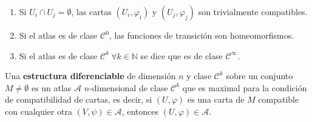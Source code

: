 \begin{obs} \:
\begin{enumerate}
    \item Si $U_i \cap U_j = \emptyset$, las cartas $(U_i, \varphi_i)$ y $(U_j, \varphi_j)$ son trivialmente compatibles.
    \item Si el atlas es de clase $\mathcal{C}^0$, las funciones de transición son homeomorfismos.
    \item Si el atlas es de clase $\mathcal C ^k \: \forall k \in \mathbb N$ se dice que es de clase $\mathcal C^{\infty}$.
\end{enumerate}
\end{obs}

\begin{defi}
Una \textbf{estructura diferenciable} de dimensión $n$ y clase $\mathcal{C}^k$ sobre un conjunto $M \neq \emptyset$ es un atlas $\mathcal{A}$ $n$-dimensional de clase $\mathcal{C}^k$ que es maximal para la condición de compatibilidad de cartas, es decir, si $(U,\varphi)$ es una carta de $M$ compatible con cualquier otra $(V,\psi) \in \mathcal{A}$, entonces $(U,\varphi)\in\mathcal{A}$.
\end{defi}

